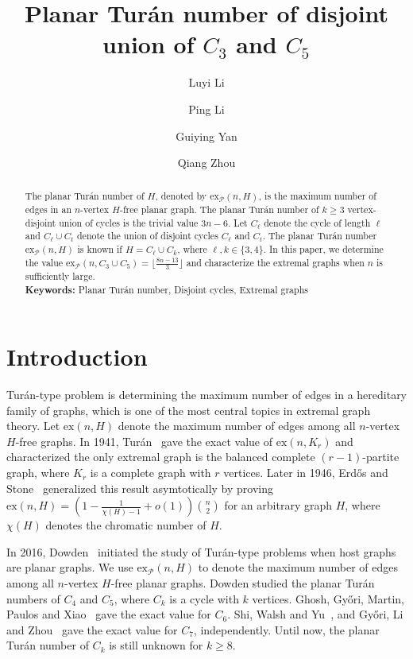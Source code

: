 \documentclass[12pt]{article}
\title{Planar Tur\'an number of disjoint union of $C_3$ and $C_5$}
\author{Luyi Li
\and Ping Li
\and Guiying Yan
\and Qiang Zhou
}
\date{}
\newcommand{\ex}{\mathrm{ex}}
\begin{document}
\maketitle

\begin{abstract}
The planar Tur\'an number of $H$, denoted by $\ex_{\mathcal{P}}(n,H)$, is the maximum number of edges in an $n$-vertex $H$-free planar graph. The planar Tur\'an number of $k\geq 3$ vertex-disjoint union of cycles is the trivial value $3n-6$.
Let $C_{\ell}$ denote the cycle of length $\ell$ and $C_{\ell}\cup C_t$ denote the union of disjoint cycles $C_{\ell}$ and $C_t$.
The planar Tur\'an number $\ex_{\mathcal{P}}(n,H)$ is known if $H=C_{\ell}\cup C_k$, where $\ell,k\in \{3,4\}$. In this paper, we determine the value $\ex_{\mathcal{P}}(n,C_3\cup C_5)=\lfloor\frac{8n-13}{3}\rfloor$ and characterize the extremal graphs when $n$ is sufficiently large.\\
\textbf{Keywords:} Planar Tur\'an number, Disjoint cycles, Extremal graphs
\end{abstract}

\maketitle

\section{Introduction} 
Tur\'an-type problem is determining the maximum number of edges in a hereditary family of graphs, which is one of the most central topics in extremal graph theory. Let $\ex(n,H)$ denote the maximum number of edges among all $n$-vertex $H$-free graphs. In 1941, Tur\'an~\cite{turan} gave the exact value of $\ex(n,K_{r})$ and characterized the only extremal graph is the balanced complete $(r-1)$-partite graph, where $K_{r}$ is a complete graph with $r$ vertices. Later in 1946, Erd\H{o}s and Stone~\cite{erdos1946} generalized this result asymtotically by proving $\ex(n,H)=(1-\frac{1}{\chi(H)-1}+o(1))\binom{n}{2}$ for an arbitrary graph $H$, where $\chi(H)$ denotes the chromatic number of $H$.

In 2016, Dowden~\cite{dowden2016} initiated the study of Tur\'an-type problems when host graphs are planar graphs. We use $\ex_{\mathcal{P}}(n,H)$ to denote the maximum number of edges among all $n$-vertex $H$-free planar graphs. Dowden studied the planar Tur\'an numbers of $C_4$ and $C_5$, where $C_k$ is a cycle with $k$ vertices. Ghosh, Gy\H{o}ri, Martin, Paulos and Xiao~\cite{ghosh2022c6} gave the exact value for $C_6$. Shi, Walsh and Yu~\cite{shi2025planar}, and Gy\H{o}ri, Li and Zhou~\cite{győri2023c7} gave the exact value for $C_7$, independently. Until now, the planar Tur\'an number of $C_{k}$ is still unknown for $k\geq 8$.
\end{document}
